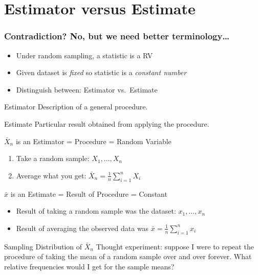 \section{Estimator versus Estimate}
\begin{frame}
  \frametitle{Contradiction? No, but we need better terminology\dots}
  \begin{itemize}
    \item Under random sampling, a statistic is a RV
    \item Given dataset is \emph{fixed} so statistic is a \emph{constant number}
    \item Distinguish between: \alert{Estimator} vs.\ \alert{Estimate}
  \end{itemize}

  \begin{alertblock}{Estimator}
   Description of a general procedure. 
  \end{alertblock}
  \begin{alertblock}{Estimate}
    Particular result obtained from applying the procedure.
  \end{alertblock}
\end{frame}
\begin{frame}
  \begin{block}{$\bar{X}_n$ is an Estimator = Procedure = Random Variable}
\begin{enumerate}
\item Take a random sample: $X_1, \hdots, X_n \quad$ 
\item Average what you get: $\bar{X}_n = \frac{1}{n}\sum_{i=1}^n X_i\quad$ 
\end{enumerate}
\end{block}

\pause
\begin{block}{$\bar{x}$ is an Estimate = Result of Procedure = Constant}
 \begin{itemize}
\item Result of taking a random sample was the dataset: $x_1, \hdots, x_n$ 
\item Result of averaging the observed data was $\bar{x} = \frac{1}{n}\sum_{i=1}^n x_i$ 
\end{itemize}
\end{block}

\pause
\begin{block}{Sampling Distribution of $\bar{X}_n$}
  \alert{Thought experiment:} suppose I were to repeat the procedure of taking the mean of a random sample over and over \alert{forever}. What \alert{relative frequencies} would I get for the sample means?
\end{block}

\end{frame}


